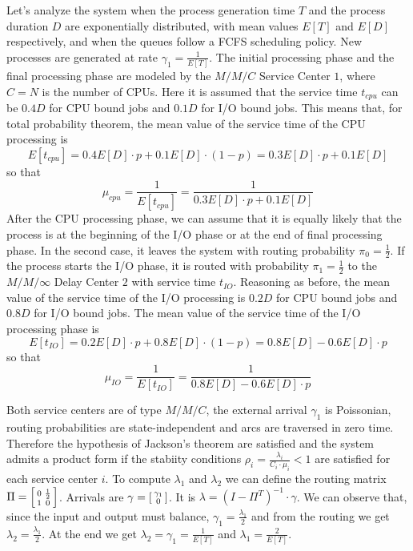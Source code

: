 Let's analyze the system when the process generation time $T$ and the process duration $D$ are exponentially distributed, with mean values $E[T]$ and $E[D]$ respectively, and when the queues follow a FCFS scheduling policy.
New processes are generated at rate $\gamma_1=\frac{1}{E[T]}$.
The initial processing phase and the final processing phase are modeled by the $M/M/C$ Service Center $1$, where $C=N$ is the number of CPUs. 
Here it is assumed that the service time $t_{cpu}$ can be $0.4D$ for CPU bound jobs and $0.1D$ for I/O bound jobs. This means that, for total probability theorem, the mean value of the service time of the CPU processing is 
\[
E[t_{cpu}]=0.4 E[D] \cdot p+0.1E[D]\cdot (1-p) = 0.3E[D]\cdot p+0.1E[D]
\]
so that 
\[
\mu_{cpu}=\frac{1}{E[t_{cpu}]}=\frac{1}{0.3E[D]\cdot p+0.1E[D]}
\]
After the CPU processing phase, we can assume that it is equally likely that the process is at the beginning of the I/O phase or at the end of final processing phase. In the second case, it leaves the system with routing probability $\pi_0=\frac{1}{2}$.
If the process starts the I/O phase, it is routed with probability $\pi_1=\frac{1}{2}$ to the $M/M/\infty$ Delay Center $2$ with service time $t_{IO}$. 
Reasoning as before, the mean value of the service time of the I/O processing is $0.2D$ for CPU bound jobs and $0.8D$ for I/O bound jobs. The mean value of the service time of the I/O processing phase is
\[
E[t_{IO}]=0.2E[D]\cdot p+0.8E[D]\cdot (1-p)=0.8E[D]-0.6E[D]\cdot p
\]
so that
\[
\mu_{IO}=\frac{1}{E[t_{IO}]}=\frac{1}{0.8E[D]-0.6E[D]\cdot p}
\]

Both service centers are of type $M/M/C$, the external arrival $\gamma_1$ is Poissonian, routing probabilities are state-independent and arcs are traversed in zero time.
Therefore the hypothesis of Jackson's theorem are satisfied and the system admits a product form if the stabiity conditions $\rho_i=\frac{\lambda_i}{C_i\cdot \mu_i}<1$ are satisfied for each service center $i$.
To compute $\lambda_1$ and $\lambda_2$ we can define the routing matrix $\Pi=\begin{bsmallmatrix} 0 & \frac{1}{2} \\ 1 & 0 \end{bsmallmatrix}$. Arrivals are $\gamma=\begin{bsmallmatrix} \gamma_1 \\ 0 \end{bsmallmatrix}$.
It is $\lambda=(I-\Pi^T)^{-1}\cdot \gamma$. We can observe that, since the input and output must balance, $\gamma_1=\frac{\lambda_1}{2}$ and from the routing we get $\lambda_2=\frac{\lambda_1}{2}$. At the end we get $\lambda_2=\gamma_1=\frac{1}{E[T]}$ and $\lambda_1=\frac{2}{E[T]}$.

